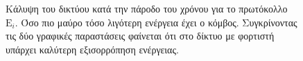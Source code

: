 \begin{figure}[H]
  \centering
  \caption{Κάλυψη του δικτύου κατά την πάροδο του χρόνου για το πρωτόκολλο $\text{E}_{i}$. Όσο πιο μαύρο τόσο λιγότερη ενέργεια έχει ο κόμβος. Συγκρίνοντας τις δύο
γραφικές παραστάσεις φαίνεται ότι στο δίκτυο με φορτιστή υπάρχει καλύτερη εξισορρόπηση ενέργειας.}
  \label{fig:5_1exp_4_3}
\end{figure}



